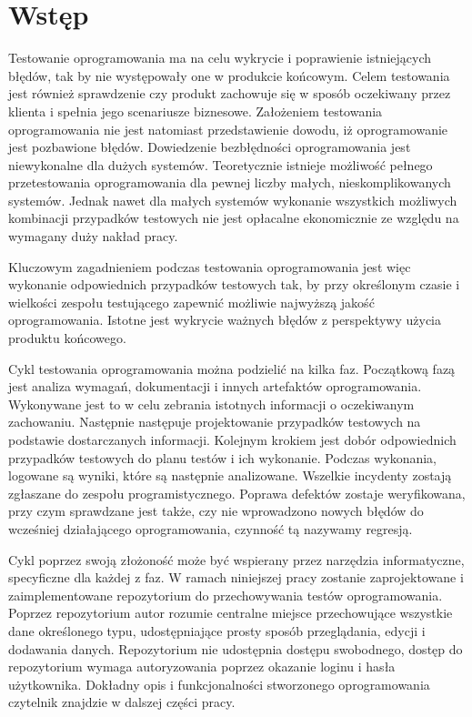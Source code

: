 \chapter{Wstęp}
Testowanie oprogramowania ma na celu wykrycie i poprawienie istniejących błędów, tak by nie występowały one w produkcie końcowym. Celem testowania jest również sprawdzenie czy produkt zachowuje się w sposób oczekiwany przez klienta i spełnia jego scenariusze biznesowe. Założeniem testowania oprogramowania nie jest natomiast przedstawienie dowodu, iż oprogramowanie jest pozbawione błędów. Dowiedzenie bezbłędności oprogramowania jest niewykonalne dla dużych systemów. Teoretycznie istnieje możliwość pełnego przetestowania oprogramowania dla pewnej liczby małych, nieskomplikowanych systemów. Jednak nawet dla małych systemów wykonanie wszystkich możliwych kombinacji przypadków testowych nie jest opłacalne ekonomicznie ze względu na wymagany duży nakład pracy. 

Kluczowym zagadnieniem podczas testowania oprogramowania jest więc wykonanie odpowiednich przypadków testowych tak, by przy określonym czasie i wielkości zespołu testującego zapewnić możliwie najwyższą jakość oprogramowania. Istotne jest wykrycie ważnych błędów z perspektywy użycia produktu końcowego.  

Cykl testowania oprogramowania można podzielić na kilka faz. Początkową fazą jest analiza wymagań, dokumentacji i innych artefaktów oprogramowania. Wykonywane jest to w celu zebrania istotnych informacji o oczekiwanym zachowaniu. Następnie następuje projektowanie przypadków testowych na podstawie dostarczanych informacji. Kolejnym krokiem jest dobór odpowiednich przypadków testowych do planu testów i ich wykonanie. Podczas wykonania, logowane są wyniki, które są następnie analizowane. Wszelkie incydenty zostają zgłaszane do zespołu programistycznego. Poprawa defektów zostaje weryfikowana, przy czym sprawdzane jest także, czy nie wprowadzono nowych błędów do wcześniej działającego oprogramowania, czynność tą nazywamy regresją.

Cykl poprzez swoją złożoność może być wspierany przez narzędzia informatyczne, specyficzne dla każdej z faz. W ramach niniejszej pracy zostanie zaprojektowane i zaimplementowane repozytorium do przechowywania testów oprogramowania. Poprzez repozytorium autor rozumie centralne miejsce przechowujące wszystkie dane określonego typu, udostępniające prosty sposób przeglądania, edycji i dodawania danych. Repozytorium nie udostępnia dostępu swobodnego, dostęp do repozytorium wymaga autoryzowania poprzez okazanie loginu i hasła użytkownika. Dokładny opis i funkcjonalności stworzonego oprogramowania czytelnik znajdzie w dalszej części pracy.
